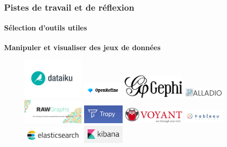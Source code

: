 \documentclass[xcolor=table]{beamer}
\begin{document}
\begin{frame}[plain]
\frametitle{Pistes de travail et de r\'eflexion}
\framesubtitle{S\'election d'outils utiles}
\textbf{Manipuler et visualiser des jeux de donn\'ees}
\begin{figure}[!]
\includegraphics[width=3cm]{images/dataiku-logo.png}
\includegraphics[width=2cm]{images/openrefine-logo.png}
\includegraphics[width=3cm]{images/gephi-logo.png}
\includegraphics[width=2cm]{images/palladiologo.png}
\includegraphics[width=3cm]{images/rawgraphs-logo.png}
\includegraphics[width=2cm]{images/tropy-logo.png}
\includegraphics[width=3cm]{images/voyanttools-logo.png}
\includegraphics[width=2cm]{images/tableau-logo.png}
\includegraphics[width=3cm]{images/elasticsearch-logo.png}
\includegraphics[width=2cm]{images/kibana-logo.png}
\end{figure}
\end{frame}
\end{document}
